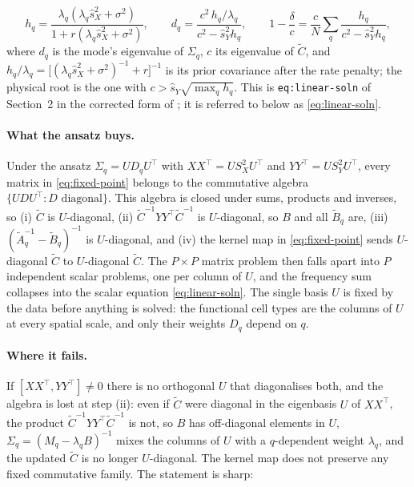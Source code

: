 \documentclass[11pt,a4paper]{article}
\newcommand{\Ct}{\tilde C}
\newcommand{\At}{\tilde A}
\newcommand{\Bt}{\tilde B}
\begin{document}
\begin{equation}
  h_q = \frac{\lambda_q(\lambda_q\hat s_X^2 + \sigma^2)}{1 + r(\lambda_q\hat s_X^2 + \sigma^2)},\qquad
  d_q = \frac{c^2\,h_q/\lambda_q}{c^2 - \hat s_Y^2 h_q},\qquad
  1 - \frac{\delta}{c} = \frac{c}{N}\sum_q\frac{h_q}{c^2 - \hat s_Y^2 h_q},
  \label{eq:linear-soln}
\end{equation}
where $d_q$ is the mode's eigenvalue of $\Sigma_q$, $c$ its eigenvalue of $\Ct$, and $h_q/\lambda_q = \big[(\lambda_q\hat s_X^2 + \sigma^2)^{-1} + r\big]^{-1}$ is its prior covariance after the rate penalty; the physical root is the one with $c > \hat s_Y\sqrt{\max_q h_q}$. This is \texttt{eq:linear-soln} of Section~2 in the corrected form of ; it is referred to below as \eqref{eq:linear-soln}.

\paragraph{What the ansatz buys.}
Under the ansatz $\Sigma_q = U D_q U^\top$ with $XX^\top = U S_X^2 U^\top$ and $YY^\top = U S_Y^2 U^\top$, every matrix in \eqref{eq:fixed-point} belongs to the commutative algebra $\{U D U^\top : D \text{ diagonal}\}$. This algebra is closed under sums, products and inverses, so (i) $\Ct$ is $U$-diagonal, (ii) $\Ct^{-1} YY^\top \Ct^{-1}$ is $U$-diagonal, so $B$ and all $\Bt_q$ are, (iii) $(\At_q^{-1} - \Bt_q)^{-1}$ is $U$-diagonal, and (iv) the kernel map in \eqref{eq:fixed-point} sends $U$-diagonal $\Ct$ to $U$-diagonal $\Ct$. The $P\times P$ matrix problem then falls apart into $P$ independent scalar problems, one per column of $U$, and the frequency sum collapses into the scalar equation \eqref{eq:linear-soln}. The single basis $U$ is fixed by the data before anything is solved: the functional cell types are the columns of $U$ at every spatial scale, and only their weights $D_q$ depend on $q$.

\paragraph{Where it fails.}
If $[XX^\top, YY^\top] \ne 0$ there is no orthogonal $U$ that diagonalises both, and the algebra is lost at step (ii): even if $\Ct$ were diagonal in the eigenbasis $U$ of $XX^\top$, the product $\Ct^{-1} YY^\top \Ct^{-1}$ is not, so $B$ has off-diagonal elements in $U$, $\Sigma_q = (M_q - \lambda_q B)^{-1}$ mixes the columns of $U$ with a $q$-dependent weight $\lambda_q$, and the updated $\Ct$ is no longer $U$-diagonal. The kernel map does not preserve any fixed commutative family. The statement is sharp:
\end{document}

